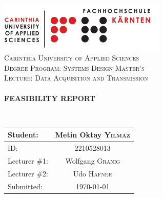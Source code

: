 \begin{titlepage}

\begin{center}


	\includegraphics[width=0.60\textwidth]{pics/FH}\\[1.5cm]

\textsc{\LARGE Carinthia University of Applied Sciences}\\[1.5cm]

\textsc{\Large Degree Program: Systems Design Master's}\\[1.5cm]
\textsc{\Large Lecture: Data Acquisition and Transmission}\\[2.5cm]


\HRule \\[1cm]

{ \huge \bfseries FEASIBILITY REPORT }

\HRule \\[1cm]


\vfill

	\begin{table}[H]
		\centering
		\begin{tabular}{|l|c|}
			\toprule
			Student: & Metin Oktay \textsc{Yilmaz} \\
			\midrule
			ID: & 2210528013   	\\
			Lecturer \#1: & Wolfgang  \textsc{Granig}  \\
            Lecturer \#2: & Udo  \textsc{Hafner}  \\
			Submitted: & {\large \today}  	\\
			\bottomrule
		\end{tabular}
	\end{table}


\end{center}

\end{titlepage}